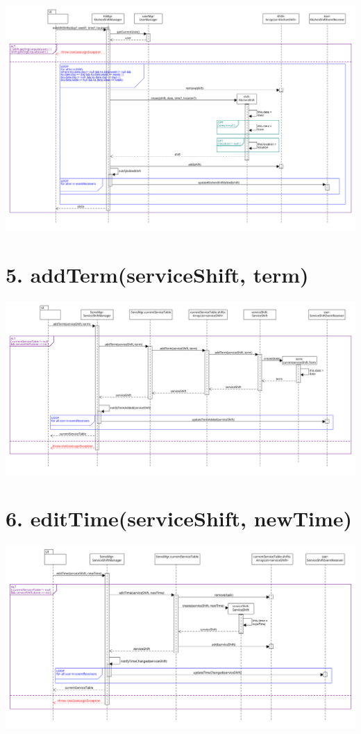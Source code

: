 \begin{center}
  \includegraphics[scale = 0.28]{images/DSD/Esame DSD 1c.png}
\end{center}
\pagebreak
\section*{5. addTerm(serviceShift, term)}

\begin{center}
  \includegraphics[scale = 0.28]{images/DSD/Esame DSD 5.png}
\end{center}
\pagebreak
\section*{6. editTime(serviceShift, newTime)}

\begin{center}
  \includegraphics[scale = 0.28]{images/DSD/Esame DSD 6.png}
\end{center}
\pagebreak
